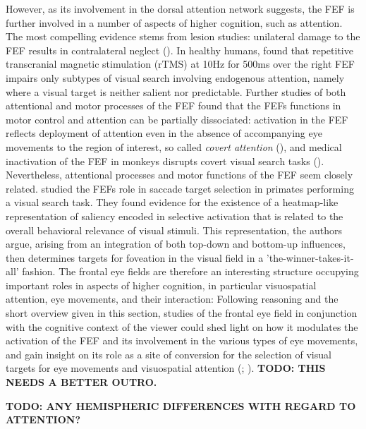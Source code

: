 \documentclass[a4paper, 12pt]{scrreprt}
\begin{document}
However, as its involvement in the dorsal attention network suggests, the FEF is further involved in a number of aspects of higher cognition, such as attention. The most compelling evidence stems from lesion studies: unilateral damage to the FEF results in contralateral neglect (\cite{crowne1981effects}). In healthy humans, \textcite{muggleton2003human} found that repetitive transcranial
magnetic stimulation (rTMS) at 10Hz for 500ms over the right FEF impairs only subtypes of visual search involving endogenous attention, namely where a visual target is neither salient nor predictable. Further studies of both attentional and motor processes of the FEF found that the FEFs functions in motor control and attention can be partially dissociated: activation in the FEF reflects deployment of attention even in the absence of accompanying eye movements to the region of interest, so called \textit{covert attention} (\cite{vossel2014dorsal}), and medical inactivation of the FEF in monkeys disrupts covert visual search tasks (\cite{monosov2009frontal}). Nevertheless, attentional processes and motor functions of the FEF seem closely related. \textcite{thompson2005visual} studied the FEFs role in saccade target selection in primates performing a visual search task. They found evidence for the existence of a heatmap-like representation of saliency encoded in selective activation that is related to the overall behavioral relevance of visual stimuli. This representation, the authors argue, arising from an integration of both top-down and bottom-up influences, then determines targets for foveation in the visual field in a 'the-winner-takes-it-all' fashion. \newline 
The frontal eye fields are therefore an interesting structure occupying important roles in aspects of higher cognition, in particular visuospatial attention, eye movements, and their interaction: Following \textcite{vernet2014corrigendum} reasoning and the short overview given in this section, studies of the frontal eye field in conjunction with the cognitive context of the viewer could shed light on how it modulates the activation of the FEF and its involvement in the various types of eye movements, and gain insight on its role as a site of conversion for the selection of visual targets for eye movements and visuospatial attention (\cite{corbetta2002control}; \cite{kowler2011eye}). \newline
\textbf{TODO: THIS NEEDS A BETTER OUTRO.}

\textbf{TODO: ANY HEMISPHERIC DIFFERENCES WITH REGARD TO ATTENTION?}
\end{document}
